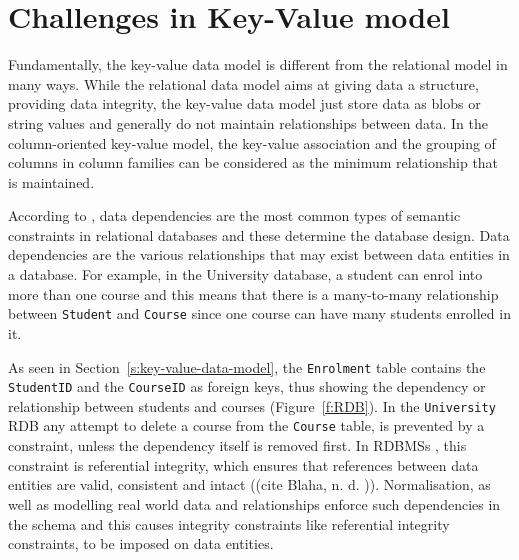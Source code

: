 \section{Challenges in Key-Value model}\label{s:challenges-key-value}
Fundamentally,   the key-value data model is different from the relational model
in many ways.  While the relational data model aims at giving data a structure,  
providing data integrity,   the key-value data model just
store data as \acp{blob} or string values and generally do not maintain
relationships between data.  In the column-oriented key-value model,   the
key-value association and the grouping of columns in column families can be
considered as the minimum relationship that is maintained.

According to ,   data dependencies are the
most common types of semantic constraints in relational databases and these
determine the database design.  Data dependencies are the various relationships
that may exist between data entities in a database.  For example,   in the
University database,   a student can enrol into more than one course and this
means that there is a many-to-many relationship between \texttt{Student} and
\texttt{Course} since   one course can have many students enrolled in it.

As seen in Section~\ref{s:key-value-data-model},   the \texttt{Enrolment} table
contains the \texttt{StudentID} and the \texttt{CourseID} as foreign keys, thus
showing the dependency or relationship between students and courses
(Figure~\ref{f:RDB}).
In the \texttt{University} \ac{RDB} any attempt to delete a course from the
\texttt{Course} table,   is prevented by a constraint,   unless the dependency
itself is removed first.  In \acp{RDBMS} ,   this constraint is referential
integrity,   which ensures that references between data entities are valid,
consistent and intact (\todo(cite Blaha,   n. d. )).
Normalisation,   as well as modelling real world data and relationships enforce
such dependencies in the schema and this causes integrity constraints like
referential integrity constraints,   to be imposed on data entities.

